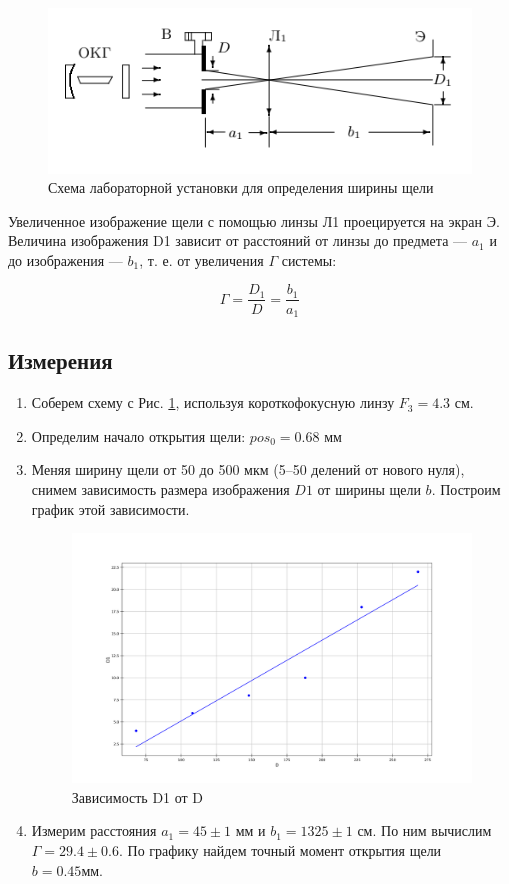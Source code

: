 \documentclass[a4paper,12pt]{article}
\begin{document}
\begin{figure}[h]
    \centering
    \includegraphics[width=15cm]{scheme_I.png}
    \caption{Схема лабораторной установки для определения ширины щели}
    \label{fig:scheme_I}
\end{figure}

Увеличенное изображение щели с помощью линзы Л1 проецируется на экран Э. Величина изображения D1 зависит от расстояний от линзы до предмета — $a_1$ и до изображения — $b_1$, т. е. от увеличения $\Gamma$ системы:

$$\Gamma=\frac{D_{1}}{D}=\frac{b_{1}}{a_{1}}$$

\newpage

\subsection*{Измерения}

\begin{enumerate}
    \item Соберем схему с Рис. \ref{fig:scheme_I}, используя короткофокусную линзу $F_3 = 4.3$ см.
    \item Определим начало открытия щели: $pos_0 = 0.68$ мм
    \item Меняя ширину щели от 50 до 500 мкм (5–50 делений от нового нуля), снимем зависимость размера изображения $D1$ от ширины щели $b$. Построим график этой зависимости.
\begin{figure}[!h]
\centering
\includegraphics[width=0.9\linewidth]{f1.png}
\caption{Зависимость D1 от D}
\label{fig:mpr}
\end{figure}

    \item Измерим расстояния $a_1 = 45 \pm 1$ мм и $b_1 = 1325 \pm 1$ см. По ним вычислим $\Gamma = 29.4 \pm 0.6$.
    По графику найдем точный момент открытия щели $b = 0.45мм$.
\end{enumerate}
\end{document}
